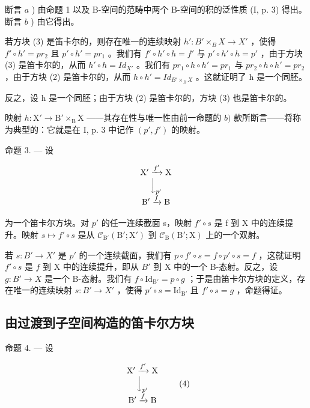 断言 \(a\) ) 由命题 1 以及 B-空间的范畴中两个 B-空间的积的泛性质 (I, p. 3) 得出。断言 \(b\) ) 由它得出。

若方块 (3) 是笛卡尔的，则存在唯一的连续映射 \(h'\colon B'\times_{B}X\to X'\) ，使得 \(f'\circ h' = pr_{2}\) 且 \(p'\circ h' = pr_{1}\) 。我们有 \(f'\circ h'\circ h = f'\) 与 \(p'\circ h'\circ h = p'\) ，由于方块 (3) 是笛卡尔的，从而 \(h'\circ h = Id_{X'}\) 。我们有 \(pr_{1}\circ h\circ h' = pr_{1}\) 与 \(pr_{2}\circ h\circ h' = pr_{2}\) ，由于方块 (2) 是笛卡尔的，从而 \(h\circ h' = Id_{B'\times_{B}X}\) 。这就证明了 h 是一个同胚。

反之，设 h 是一个同胚；由于方块 (2) 是笛卡尔的，方块 (3) 也是笛卡尔的。

映射 \(h \colon \mathrm{X}' \to \mathrm{B}' \times_{\mathrm{B}} \mathrm{X}\) ——其存在性与唯一性由前一命题的 \(b)\) 款所断言——将称为典型的：它就是在 I, p. 3 中记作 \((p', f')\) 的映射。

命题 3. --- 设

\[
\begin{array}{c} \mathrm {X^ {\prime}} \xrightarrow {f ^ {\prime}} \mathrm{X} \\ \Big \downarrow_ {p ^ {\prime}} \\ \mathrm {B^ {\prime}} \xrightarrow {f} \mathrm{B} \end{array}
\]

为一个笛卡尔方块。对 \(p'\) 的任一连续截面 s，映射 \(f'\circ s\) 是 f 到 X 中的连续提升。映射 \(s\mapsto f'\circ s\) 是从 \(\mathcal{C}_{\mathrm{B}'}(\mathrm{B}';\mathrm{X}')\) 到 \(\mathcal{C}_{\mathrm{B}}(\mathrm{B}';\mathrm{X})\) 上的一个双射。

若 \(s \colon B' \to X'\) 是 \(p'\) 的一个连续截面，我们有 \(p \circ f' \circ s = f \circ p' \circ s = f\) ，这就证明 \(f' \circ s\) 是 \(f\) 到 X 中的连续提升，即从 \(B'\) 到 X 中的一个 B-态射。反之，设 \(g \colon B' \to X\) 是一个 B-态射。我们有 \(f \circ \mathrm{Id}_{\mathrm{B}'} = p \circ g\) ；于是由笛卡尔方块的定义，存在唯一的连续映射 \(s \colon B' \to X'\) ，使得 \(p' \circ s = \mathrm{Id}_{\mathrm{B}'}\) 且 \(f' \circ s = g\) ，命题得证。

\subsection{由过渡到子空间构造的笛卡尔方块}

命题 4. --- 设

\[
\begin{array}{c} \mathrm {X^ {\prime}} \xrightarrow {f ^ {\prime}} \mathrm{X} \\ \Big \downarrow_ {p ^ {\prime}} \\ \mathrm {B^ {\prime}} \xrightarrow {f} \mathrm{B} \end{array}\tag{4}
\]

